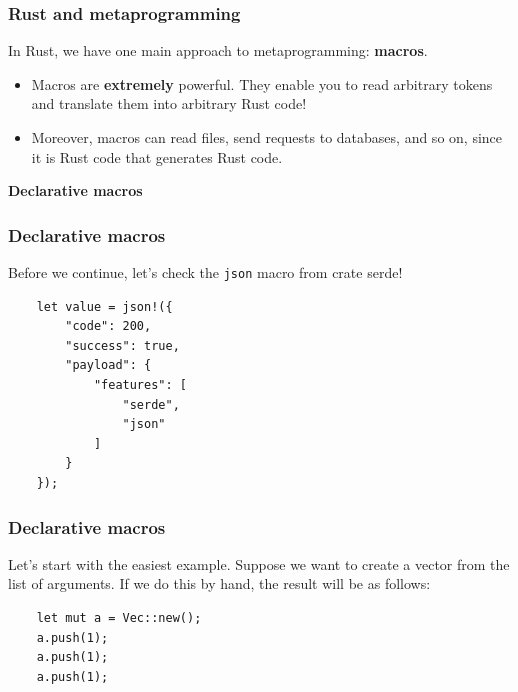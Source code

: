 \documentclass[aspectratio=1610,t]{beamer}
\begin{document}

\begin{frame}[fragile]
\frametitle{Rust and metaprogramming}
In Rust, we have one main approach to metaprogramming: \textbf{macros}.

\begin{itemize}
    \item<2-> Macros are \textbf{extremely} powerful. They enable you to read arbitrary tokens and translate them into arbitrary Rust code!
    \item<3-> Moreover, macros can read files, send requests to databases, and so on, since it is Rust code that generates Rust code.
\end{itemize}

\end{frame}


\begin{frame}[c]
\centering\Huge\textbf{Declarative macros}
\end{frame}


\begin{frame}[fragile]
\frametitle{Declarative macros}
Before we continue, let's check the \texttt{json} macro from crate serde!

\begin{verbatim}
    let value = json!({
        "code": 200,
        "success": true,
        "payload": {
            "features": [
                "serde",
                "json"
            ]
        }
    });
\end{verbatim}
\end{frame}


\begin{frame}[fragile]
\frametitle{Declarative macros}
Let's start with the easiest example. Suppose we want to create a vector from the list of arguments. If we do this by hand, the result will be as follows:

\begin{verbatim}
    let mut a = Vec::new();
    a.push(1);
    a.push(1);
    a.push(1);
\end{verbatim}
\end{frame}
\end{document}

